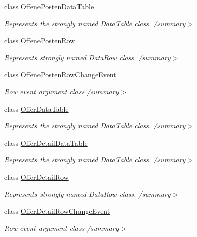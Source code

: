 \begin{DoxyCompactItemize}
class \hyperlink{class_products_1_1_data_1_1ds_sage_1_1_offene_posten_data_table}{Offene\+Posten\+Data\+Table}
\begin{DoxyCompactList}\small\item\em Represents the strongly named Data\+Table class. /summary$>$ \end{DoxyCompactList}\item 
class \hyperlink{class_products_1_1_data_1_1ds_sage_1_1_offene_posten_row}{Offene\+Posten\+Row}
\begin{DoxyCompactList}\small\item\em Represents strongly named Data\+Row class. /summary$>$ \end{DoxyCompactList}\item 
class \hyperlink{class_products_1_1_data_1_1ds_sage_1_1_offene_posten_row_change_event}{Offene\+Posten\+Row\+Change\+Event}
\begin{DoxyCompactList}\small\item\em Row event argument class /summary$>$ \end{DoxyCompactList}\item 
class \hyperlink{class_products_1_1_data_1_1ds_sage_1_1_offer_data_table}{Offer\+Data\+Table}
\begin{DoxyCompactList}\small\item\em Represents the strongly named Data\+Table class. /summary$>$ \end{DoxyCompactList}\item 
class \hyperlink{class_products_1_1_data_1_1ds_sage_1_1_offer_detail_data_table}{Offer\+Detail\+Data\+Table}
\begin{DoxyCompactList}\small\item\em Represents the strongly named Data\+Table class. /summary$>$ \end{DoxyCompactList}\item 
class \hyperlink{class_products_1_1_data_1_1ds_sage_1_1_offer_detail_row}{Offer\+Detail\+Row}
\begin{DoxyCompactList}\small\item\em Represents strongly named Data\+Row class. /summary$>$ \end{DoxyCompactList}\item 
class \hyperlink{class_products_1_1_data_1_1ds_sage_1_1_offer_detail_row_change_event}{Offer\+Detail\+Row\+Change\+Event}
\begin{DoxyCompactList}\small\item\em Row event argument class /summary$>$ \end{DoxyCompactList}\item 

\end{DoxyCompactItemize}
